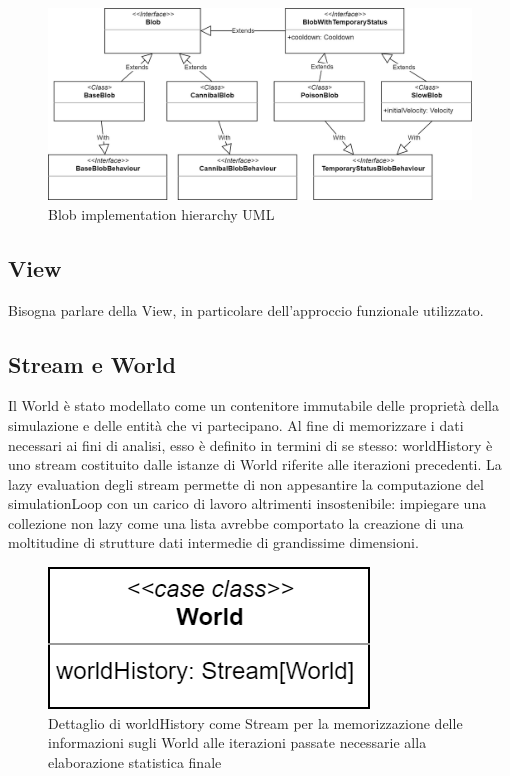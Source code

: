 \begin{figure}[h!]
\centering
\includegraphics[width=\textwidth, scale=0.44]{img/Blob implementation.png}
\caption{Blob implementation hierarchy  UML}
\label{fig:Blob implementation}
\end{figure}


\subsection{View}
Bisogna parlare della View, in particolare dell'approccio funzionale utilizzato.


\subsection{Stream e World}
Il World è stato modellato come un contenitore immutabile delle proprietà della simulazione e delle entità che vi partecipano. Al fine di memorizzare i dati necessari ai fini di analisi, esso è definito in termini di se stesso: worldHistory è uno stream costituito dalle istanze di World riferite alle iterazioni precedenti. La lazy evaluation degli stream permette di non appesantire la computazione del simulationLoop con un carico di lavoro altrimenti insostenibile: impiegare una collezione non lazy come una lista avrebbe comportato la creazione di una moltitudine di strutture dati intermedie di grandissime dimensioni. 

\begin{figure}[h!]
\centering
\includegraphics[scale=0.30]{img/WorldDetail.png}
\caption{Dettaglio di worldHistory come Stream per la memorizzazione delle informazioni sugli World alle iterazioni passate necessarie alla elaborazione statistica finale}
\label{fig:worldDetail}
\end{figure}

